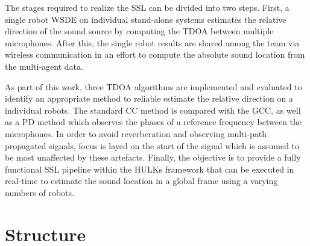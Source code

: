 The stages required to realize the \ac{SSL} can be divided into two steps.
First, a single robot \ac{WSDE} on individual stand-alone systems estimates the
relative direction of the sound source by computing the \ac{TDOA} between
multiple microphones. After this, the single robot results are shared among the team
via wireless communication in an effort to compute the absolute sound location
from the multi-agent data.


As part of this work, three \ac{TDOA} algorithms are implemented and evaluated
to identify an appropriate method to reliable estimate the relative direction
on a individual robots. The standard \acf{CC} method is compared with the
\acf{GCC}, as well as a \ac{PD} method which observes the phases of a reference
frequency between the microphones. In order to avoid reverberation and
observing multi-path propagated signals, focus is layed on the start of the
signal which is assumed to be most unaffected by these artefacts. Finally, the
objective is to provide a fully functional \ac{SSL} pipeline within the HULKs
framework that can be executed in real-time to estimate the sound location in
a global frame using a varying numbers of robots.


\section{Structure}
\label{sec:01_Structure}


